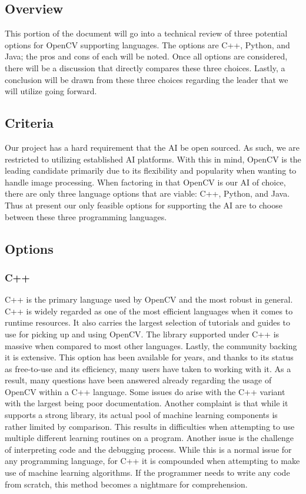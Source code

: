 \documentclass[onecolumn, draftclsnofoot,10pt, compsoc]{IEEEtran}
\begin{document}
\subsection{Overview}
This portion of the document will go into a technical review of three potential options for OpenCV supporting languages. The options are C++, Python, and Java; the pros and cons of each will be noted. Once all options are considered, there will be a discussion that directly compares these three choices. Lastly, a conclusion will be drawn from these three choices regarding the leader that we will utilize going forward.

\subsection{Criteria}
Our project has a hard requirement that the AI be open sourced. As such, we are restricted to utilizing established AI platforms. With this in mind, OpenCV is the leading candidate primarily due to its flexibility and popularity when wanting to handle image processing. When factoring in that OpenCV is our AI of choice, there are only three language options that are viable: C++, Python, and Java. Thus at present our only feasible options for supporting the AI are to choose between these three programming languages.

\subsection{Options}
\subsubsection{C++}
C++ is the primary language used by OpenCV and the most robust in general. C++ is widely regarded as one of the most efficient languages when it comes to runtime resources. It also carries the largest selection of tutorials and guides to use for picking up and using OpenCV. The library supported under C++ is massive when compared to most other languages. Lastly, the community backing it is extensive. This option has been available for years, and thanks to its status as free-to-use and its efficiency, many users have taken to working with it. As a result, many questions have been answered already regarding the usage of OpenCV within a C++ language. Some issues do arise with the C++ variant with the largest being poor documentation. Another complaint is that while it supports a strong library, its actual pool of machine learning components is rather limited by comparison. This results in difficulties when attempting to use multiple different learning routines on a program. Another issue is the challenge of interpreting code and the debugging process. While this is a normal issue for any programming language, for C++ it is compounded when attempting to make use of machine learning algorithms. If the programmer needs to write any code from scratch, this method becomes a nightmare for comprehension.
\end{document}
